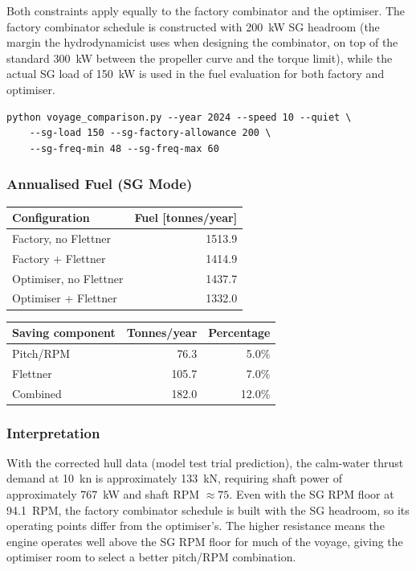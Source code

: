 \documentclass[a4paper,11pt]{article}
\begin{document}
Both constraints apply equally to the factory combinator and the optimiser.  The
factory combinator schedule is constructed with \SI{200}{\kilo\watt} SG headroom
(the margin the hydrodynamicist uses when designing the combinator, on top of the
standard \SI{300}{\kilo\watt} between the propeller curve and the torque limit),
while the actual SG load of \SI{150}{\kilo\watt} is used in the fuel evaluation
for both factory and optimiser.

\begin{verbatim}
python voyage_comparison.py --year 2024 --speed 10 --quiet \
    --sg-load 150 --sg-factory-allowance 200 \
    --sg-freq-min 48 --sg-freq-max 60
\end{verbatim}

\subsubsection{Annualised Fuel (SG Mode)}
\label{sec:orged36cc5}

\begin{center}
\begin{tabular}{lr}
\toprule
Configuration & Fuel [tonnes/year]\\[0pt]
\midrule
Factory, no Flettner & 1513.9\\[0pt]
Factory + Flettner & 1414.9\\[0pt]
Optimiser, no Flettner & 1437.7\\[0pt]
Optimiser + Flettner & 1332.0\\[0pt]
\bottomrule
\end{tabular}
\end{center}

\begin{center}
\begin{tabular}{lrr}
\toprule
Saving component & Tonnes/year & Percentage\\[0pt]
\midrule
Pitch/RPM & 76.3 & 5.0\%\\[0pt]
Flettner & 105.7 & 7.0\%\\[0pt]
Combined & 182.0 & 12.0\%\\[0pt]
\bottomrule
\end{tabular}
\end{center}

\subsubsection{Interpretation}
\label{sec:org95b0c06}

With the corrected hull data (model test trial prediction), the calm-water
thrust demand at \SI{10}{\knot} is approximately \SI{133}{\kilo\newton},
requiring shaft power of approximately \SI{767}{\kilo\watt} and shaft RPM
\(\approx 75\).  Even with the SG RPM floor at \SI{94.1}{RPM}, the factory
combinator schedule is built with the SG headroom, so its operating points
differ from the optimiser's.  The higher resistance means the engine operates
well above the SG RPM floor for much of the voyage, giving the optimiser room to
select a better pitch/RPM combination.
\end{document}
